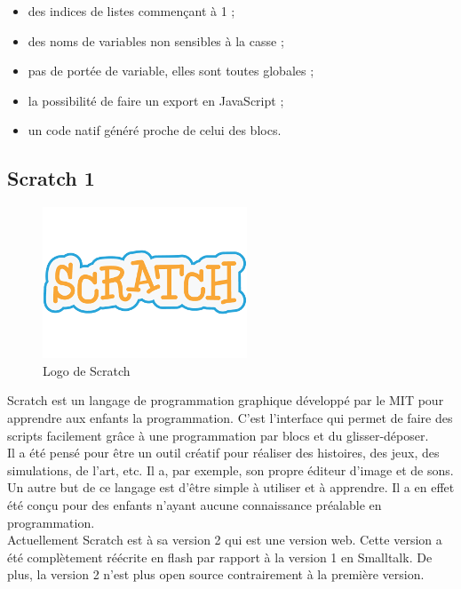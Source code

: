 \begin{itemize}
  \item des indices de listes commençant à 1 ;
  \item des noms de variables non sensibles à la casse ;
  \item pas de portée de variable, elles sont toutes globales ;
  \item la possibilité de faire un export en JavaScript ;
  \item un code natif généré proche de celui des blocs.
\end{itemize}

\subsection{Scratch 1}
\begin{figure}[!h]
  \begin{center}
    \includegraphics[scale=0.4]{content/5-related_work/images/scratch}
    \caption{Logo de Scratch}
    \label{fig:scratch}
  \end{center}
\end{figure}
Scratch est un langage de programmation graphique développé par le MIT pour apprendre aux enfants la programmation. C'est l'interface qui permet de faire des scripts facilement grâce à une programmation par blocs et du glisser-déposer.\\

Il a été pensé pour être un outil créatif pour réaliser des histoires, des jeux, des simulations, de l'art, etc. Il a, par exemple, son propre éditeur d'image et de sons. Un autre but de ce langage est d'être simple à utiliser et à apprendre. Il a en effet été conçu pour des enfants n'ayant aucune connaissance préalable en programmation.\\

Actuellement Scratch est à sa version 2 qui est une version web. Cette version a été complètement réécrite en flash par rapport à la version 1 en Smalltalk. De plus, la version 2 n'est plus open source contrairement à la première version.

